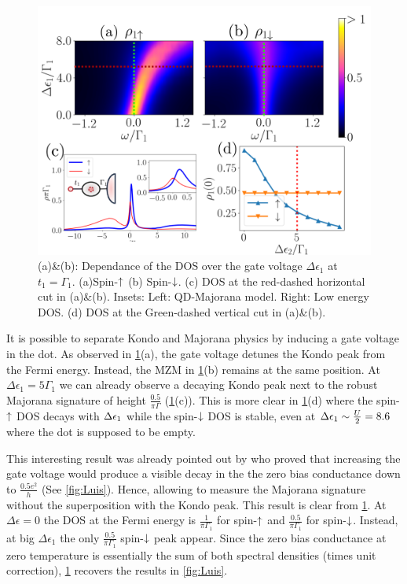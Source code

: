  \begin{figure}[t]
 \centering
   \includegraphics[scale=0.6]{IMAGES/Majorana/NRG-FullED.png}
   \caption{ \label{fig:QD-ed}(a)\&(b): Dependance of the DOS over the gate voltage $\Delta \epsilon_1$ at $t_1 = \Gamma_1$. (a)Spin-$\uparrow$ (b) Spin-$\downarrow$. (c) DOS at the red-dashed horizontal cut in (a)\&(b). Insets: Left: QD-Majorana model. Right: Low energy DOS. (d) DOS at the Green-dashed vertical cut in (a)\&(b). \protect{} }
   \end{figure}

 It is possible to separate Kondo and Majorana physics by inducing a gate voltage in the dot. As observed in \ref{fig:QD-ed}(a), the gate voltage detunes the Kondo peak from the Fermi energy. Instead, the MZM in \ref{fig:QD-ed}(b) remains at the same position. At $\Delta \epsilon_1 = 5\Gamma_1$ we can already observe a decaying Kondo peak next to the robust Majorana signature of height $\frac{0.5}{\pi\Gamma}$ (\ref{fig:QD-ed}(c)). This is more clear in \ref{fig:QD-ed}(d) where the spin-$\uparrow$ DOS decays with $\Delta \epsilon_1$ while the spin-$\downarrow$ DOS is stable, even at $\Delta \epsilon_1 \sim \frac{U}{2} = 8.6$ where the dot is supposed to be empty. 



 This interesting result was already pointed out by  \citeauthor{ruiz-tijerina_interaction_2015}  
 who proved that increasing the gate voltage would produce a visible decay in the the zero bias conductance down to $\frac{0.5 e^2}{h}$ (See \ref{fig:Luis}). Hence, allowing to measure the Majorana signature without the superposition with the Kondo peak.  This result is clear from \ref{fig:QD-ed}. At $\Delta \epsilon = 0$ the DOS at the Fermi energy is $\frac{1}{\pi \Gamma_1}$ for spin-$\uparrow$ and $\frac{0.5}{\pi \Gamma_1}$ for spin-$\downarrow$. Instead, at big $\Delta \epsilon_1$ the only $\frac{0.5}{\pi \Gamma_1}$ spin-$\downarrow$ peak appear.  Since the zero bias conductance at zero temperature is essentially the sum of both spectral densities (times unit correction), \ref{fig:QD-ed} recovers the results in \ref{fig:Luis}. 

